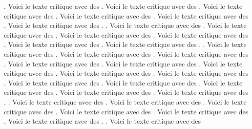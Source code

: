 \documentclass[openany]{book}
\begin{document}
\begin{pages}
\begin{Rightside}
    . Voici le texte critique avec des
    . Voici le texte critique avec des
    . Voici le texte critique avec des
    . Voici le texte critique avec des
    . Voici le texte critique avec des
    . Voici le texte critique avec des
    . 
    . Voici le texte critique avec des
    . Voici le texte critique avec des
    . Voici le texte critique avec des
    . Voici le texte critique avec des
    . Voici le texte critique avec des
    . Voici le texte critique avec des
    . 
    . Voici le texte critique avec des
    . Voici le texte critique avec des
    . Voici le texte critique avec des
    . Voici le texte critique avec des
    . Voici le texte critique avec des
    . Voici le texte critique avec des
    . 
    \pend
    \pstart
    Voici le texte critique avec des
    . Voici le texte critique avec des
    . Voici le texte critique avec des
    . Voici le texte critique avec des
    . Voici le texte critique avec des
    . Voici le texte critique avec des
    . Voici le texte critique avec des
    . 
    . Voici le texte critique avec des
    . Voici le texte critique avec des
    . Voici le texte critique avec des
    . Voici le texte critique avec des
    . Voici le texte critique avec des
    . Voici le texte critique avec des
    . 
    . Voici le texte critique avec des

\end{Rightside}
\end{pages}
\end{document}
